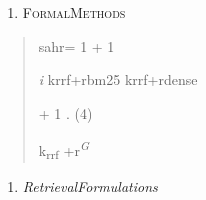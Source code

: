 \documentclass[
]{article}
\begin{document}
\begin{enumerate}
\def\labelenumi{\Roman{enumi}.}
\setcounter{enumi}{3}
\item
  \protect{}\label{Formal_Methods}{}\textsc{FormalMethods}
\end{enumerate}

\begin{quote}
\protect{}\label{_bookmark4}{}sahr= 1 + 1

\emph{i} krrf+rbm25 krrf+rdense

+ 1 . (4)

k\textsubscript{rrf} +r\emph{\textsuperscript{G}}
\end{quote}

\begin{enumerate}
\def\labelenumi{\Alph{enumi}.}
\item
  \emph{RetrievalFormulations}
\end{enumerate}
\end{document}
